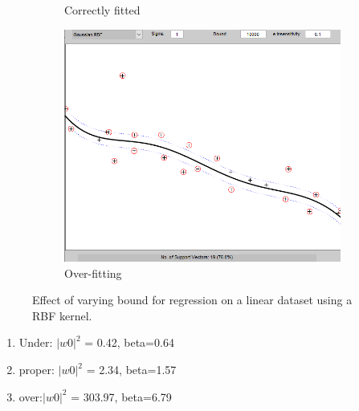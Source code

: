 \documentclass{article}
\begin{document}
\begin{figure}[h]
\begin{subfigure}[b]{0.3\textwidth}
                 \caption{Correctly fitted}
                 \label{fig:rbf_medium_bound}
             \end{subfigure}
             \hfill
             \begin{subfigure}[b]{0.3\textwidth}
                 \centering
                 \includegraphics[width=\textwidth]{Assignment 2/figures/1_1/rbf_bound_large.png}
                 \caption{Over-fitting}
                 \label{fig:rbf_medium_bound}
             \end{subfigure}
            \caption{Effect of varying bound for regression on a linear dataset using a RBF kernel.}
        \end{figure}
        
        \begin{enumerate}
            \item Under: $|w0|^2$ = 0.42, beta=0.64
            \item proper: $|w0|^2$ = 2.34, beta=1.57
            \item over:$|w0|^2$ = 303.97, beta=6.79
        \end{enumerate}
        
\end{document}
